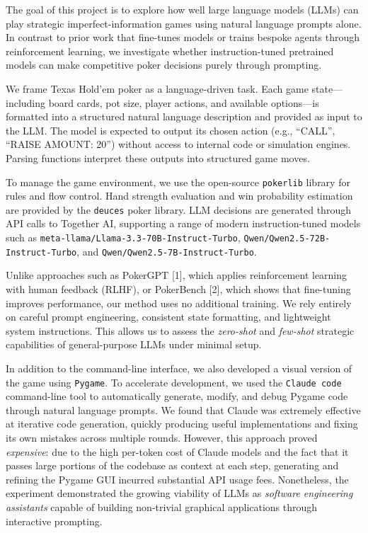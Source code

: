 \documentclass{article}
\begin{document}
The goal of this project is to explore how well large language models (LLMs) can play strategic imperfect-information games using natural language prompts alone. In contrast to prior work that fine-tunes models or trains bespoke agents through reinforcement learning, we investigate whether instruction-tuned pretrained models can make competitive poker decisions purely through prompting.

We frame Texas Hold'em poker as a language-driven task. Each game state---including board cards, pot size, player actions, and available options---is formatted into a structured natural language description and provided as input to the LLM. The model is expected to output its chosen action (e.g., ``CALL'', ``RAISE AMOUNT: 20'') without access to internal code or simulation engines. Parsing functions interpret these outputs into structured game moves.

To manage the game environment, we use the open-source \texttt{pokerlib} library for rules and flow control. Hand strength evaluation and win probability estimation are provided by the \texttt{deuces} poker library. LLM decisions are generated through API calls to Together AI, supporting a range of modern instruction-tuned models such as \texttt{meta-llama/Llama-3.3-70B-Instruct-Turbo}, \texttt{Qwen/Qwen2.5-72B-Instruct-Turbo}, and \texttt{Qwen/Qwen2.5-7B-Instruct-Turbo}.

Unlike approaches such as PokerGPT [1], which applies reinforcement learning with human feedback (RLHF), or PokerBench [2], which shows that fine-tuning improves performance, our method uses no additional training. We rely entirely on careful prompt engineering, consistent state formatting, and lightweight system instructions. This allows us to assess the \emph{zero-shot} and \emph{few-shot} strategic capabilities of general-purpose LLMs under minimal setup.

In addition to the command-line interface, we also developed a visual version of the game using \texttt{Pygame}. To accelerate development, we used the \texttt{Claude code} command-line tool to automatically generate, modify, and debug Pygame code through natural language prompts. We found that Claude was extremely effective at iterative code generation, quickly producing useful implementations and fixing its own mistakes across multiple rounds. However, this approach proved \emph{expensive}: due to the high per-token cost of Claude models and the fact that it passes large portions of the codebase as context at each step, generating and refining the Pygame GUI incurred substantial API usage fees. Nonetheless, the experiment demonstrated the growing viability of LLMs as \emph{software engineering assistants} capable of building non-trivial graphical applications through interactive prompting.
\end{document}
